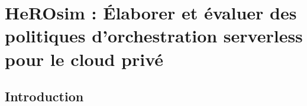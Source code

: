 \chapter{HeROsim : Élaborer et évaluer des politiques d'orchestration serverless pour le cloud privé}
\label{chapter:herosim}




\section{Introduction}
\label{section:herosim-introduction}


